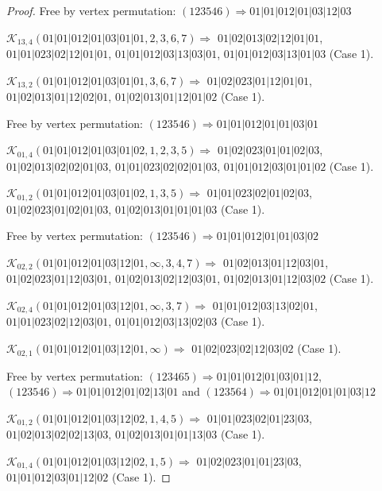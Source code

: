 \documentclass[12pt]{article}
\theoremstyle{plain}
\theoremstyle{definition}
\theoremstyle{remark}
\newcommand{\fancy}[1]{\mathcal{#1}}
\def\K{\fancy{K}}
\begin{document}
\begin{proof}
	Free by vertex permutation: $(1 2 3 5 4 6)\Rightarrow 01|01|012|01|03|12|03$
	
	
	
	\bigskip
	
	$\K_{13,4}(01|01|012|01|03|01|01,2, 3, 6, 7)\Rightarrow $ $01|02|013|02|12|01|01$, $01|01|023|02|12|01|01$, $01|01|012|03|13|03|01$, $01|01|012|03|13|01|03$ (Case 1).
	
	$\K_{13,2}(01|01|012|01|03|01|01,3, 6, 7)\Rightarrow $ $01|02|023|01|12|01|01$, $01|02|013|01|12|02|01$, $01|02|013|01|12|01|02$ (Case 1).
	
	
	
	Free by vertex permutation: $(1 2 3 5 4 6)\Rightarrow 01|01|012|01|01|03|01$
	
	
	
	\bigskip
	
	$\K_{01,4}(01|01|012|01|03|01|02,1, 2, 3, 5)\Rightarrow $ $01|02|023|01|01|02|03$, $01|02|013|02|02|01|03$, $01|01|023|02|02|01|03$, $01|01|012|03|01|01|02$ (Case 1).
	
	$\K_{01,2}(01|01|012|01|03|01|02,1, 3, 5)\Rightarrow $ $01|01|023|02|01|02|03$, $01|02|023|01|02|01|03$, $01|02|013|01|01|01|03$ (Case 1).
	
	
	
	Free by vertex permutation: $(1 2 3 5 4 6)\Rightarrow 01|01|012|01|01|03|02$
	
	
	
	\bigskip
	
	$\K_{02,2}(01|01|012|01|03|12|01,\infty,3, 4, 7)\Rightarrow $ $01|02|013|01|12|03|01$, $01|02|023|01|12|03|01$, $01|02|013|02|12|03|01$, $01|02|013|01|12|03|02$ (Case 1).
	
	$\K_{02,4}(01|01|012|01|03|12|01,\infty,3, 7)\Rightarrow $ $01|01|012|03|13|02|01$, $01|01|023|02|12|03|01$, $01|01|012|03|13|02|03$ (Case 1).
	
	$\K_{02,1}(01|01|012|01|03|12|01,\infty)\Rightarrow $ $01|02|023|02|12|03|02$ (Case 1).
	
	
	
	Free by vertex permutation: $(1 2 3 4 6 5)\Rightarrow 01|01|012|01|03|01|12$, $(1 2 3 5 4 6)\Rightarrow 01|01|012|01|02|13|01$ and $(1 2 3 5 6 4)\Rightarrow 01|01|012|01|01|03|12$
	
	
	
	\bigskip
	
	$\K_{01,2}(01|01|012|01|03|12|02,1, 4, 5)\Rightarrow $ $01|01|023|02|01|23|03$, $01|02|013|02|02|13|03$, $01|02|013|01|01|13|03$ (Case 1).
	
	$\K_{01,4}(01|01|012|01|03|12|02,1, 5)\Rightarrow $ $01|02|023|01|01|23|03$, $01|01|012|03|01|12|02$ (Case 1).
	

\end{proof}
\end{document}
